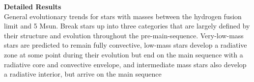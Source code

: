\textbf{Detailed Results} \\
General evolutionary trends for stars with masses between the hydrogen fusion limit and 5 Msun. Break stars up into three categories that are largely defined by their structure and evolution throughout the pre-main-sequence. Very-low-mass stars are predicted to remain fully convective, low-mass stars develop a radiative zone at some point during their evolution but end on the main sequence with a radiative core and convective envelope, and intermediate mass stars also develop a radiative interior, but arrive on the main sequence